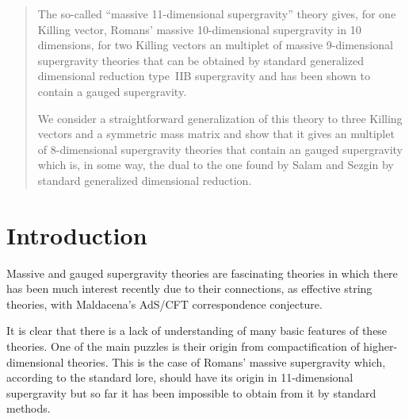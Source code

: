\documentclass[12pt,a4paper]{article}
\begin{document}
\begin{quotation}

\small

The so-called ``massive 11-dimensional supergravity'' theory gives,
for one Killing vector, Romans' massive 10-dimensional supergravity in
10 dimensions, for two Killing vectors an \coordHE{} multiplet
of massive 9-dimensional supergravity theories that can be obtained by
standard generalized dimensional reduction type~IIB supergravity
and has been shown to contain a gauged supergravity.

We consider a straightforward generalization of this theory to three
Killing vectors and a \coordHE{} symmetric mass matrix and show that
it gives an \coordHE{} multiplet of 8-dimensional supergravity
theories that contain an \coordHE{} gauged supergravity which is, in some
way, the dual to the one found by Salam and Sezgin by standard
generalized dimensional reduction.

\end{quotation}


\newpage

\pagestyle{plain}

\section*{Introduction}


Massive and gauged supergravity theories are fascinating theories in
which there has been much interest recently due to their connections,
as effective string theories, with Maldacena's AdS/CFT correspondence
conjecture.

It is clear that there is a lack of understanding of many basic
features of these theories. One of the main puzzles is their origin
from compactification of higher-dimensional theories.  This is the
case of Romans' massive \coordHE{} supergravity \cite{kn:Ro2} which,
according to the standard lore, should have its origin in
11-dimensional supergravity but so far it has been impossible to
obtain from it by standard methods.
\end{document}
